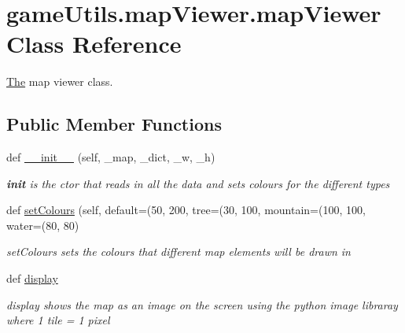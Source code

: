 \hypertarget{classgame_utils_1_1map_viewer_1_1map_viewer}{}\section{game\+Utils.\+map\+Viewer.\+map\+Viewer Class Reference}
\label{classgame_utils_1_1map_viewer_1_1map_viewer}


\hyperlink{namespace_the}{The} map viewer class.  


\subsection*{Public Member Functions}
\begin{DoxyCompactItemize}
\item 
def \hyperlink{classgame_utils_1_1map_viewer_1_1map_viewer_ab1576e7b3e3c4643ba95633470ea90d0}{\+\_\+\+\_\+init\+\_\+\+\_\+} (self, \+\_\+map, \+\_\+dict, \+\_\+w, \+\_\+h)
\begin{DoxyCompactList}\small\item\em {\bfseries init} is the ctor that reads in all the data and sets colours for the different types \end{DoxyCompactList}\item 
def \hyperlink{classgame_utils_1_1map_viewer_1_1map_viewer_ad56427107d700acbd81da8b8e5281d5d}{set\+Colours} (self, default=(50, 200, tree=(30, 100, mountain=(100, 100, water=(80, 80)
\begin{DoxyCompactList}\small\item\em set\+Colours sets the colours that different map elements will be drawn in \end{DoxyCompactList}\item 
def \hyperlink{classgame_utils_1_1map_viewer_1_1map_viewer_a42ed31e228f6b7b569262a9bd8a770d4}{display}
\begin{DoxyCompactList}\small\item\em display shows the map as an image on the screen using the python image libraray where 1 tile = 1 pixel \end{DoxyCompactList}\end{DoxyCompactItemize}
